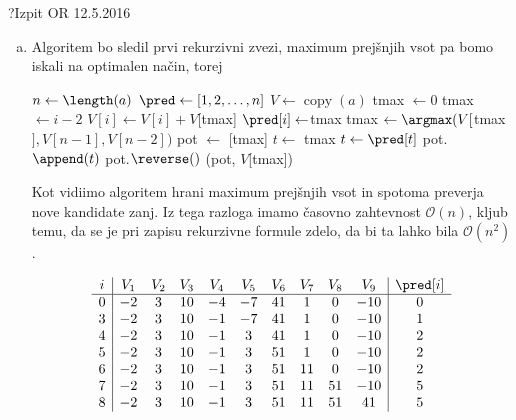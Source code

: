 \begin{naloga}{?}{Izpit OR 12.5.2016}
\begin{odgovor}
\begin{enumerate}[(a)]
\item Algoritem bo sledil prvi rekurzivni zvezi, 
maximum prejšnjih vsot pa bomo iskali na optimalen način, torej

\begin{algorithmic}
	\State $n \gets \length(a)$
	\State $\pred \gets [1, 2, \dots, n]$
	\State $V \gets \operatorname{copy}(a)$
	\State tmax $\gets 0$
			\State tmax $\gets i - 2$
		\EndIf
			\State $V[i] \gets  V[i] + V$[tmax]
			\State $\pred[i] \gets $tmax
		\EndIf
	\EndFor
	\State tmax $\gets \argmax(V[$tmax$], V[n-1], V[n-2])$
	\State pot $\gets$ [tmax]
	\State $t \gets$ tmax
		\State $t \gets \pred[t]$
		\State pot.$\append(t)$
	\EndWhile
	\State pot.$\reverse()$
	\State \Return (pot, $V$[tmax])
\EndFunction
\end{algorithmic}

Kot vidiimo algoritem hrani maximum prejšnjih vsot in spotoma preverja nove kandidate zanj.
Iz tega razloga imamo časovno zahtevnost $\mathcal{O}(n)$, kljub temu, da se je pri zapisu 
rekurzivne formule zdelo, da bi ta lahko bila $\mathcal{O}(n^2)$.

\begin{tabela}
$$
\begin{array}{c|ccccccccc|c}
i & V_1 & V_2 & V_3 & V_4 & V_5 & V_6 & V_7 & V_8 & V_9 & \pred[i]  \\ \hline
0 & -2 & 3 & 10 & -4 & -7 & 41 & 1 & 0 & -10 & 0 \\
3 & -2 & 3 & 10 & -1 & -7 & 41 & 1 & 0 & -10 & 1 \\
4 & -2 & 3 & 10 & -1 & 3 & 41 & 1 & 0 & -10 & 2 \\
5 & -2 & 3 & 10 & -1 & 3 & 51 & 1 & 0 & -10 & 2 \\
6 & -2 & 3 & 10 & -1 & 3 & 51 & 11 & 0 & -10 & 2 \\
7 & -2 & 3 & 10 & -1 & 3 & 51 & 11 & 51 & -10 & 5 \\
8 & -2 & 3 & 10 & -1 & 3 & 51 & 11 & 51 & 41 & 5 \\
\end{array}
$$
\end{tabela}

\end{enumerate}

\end{odgovor}
\end{naloga}
